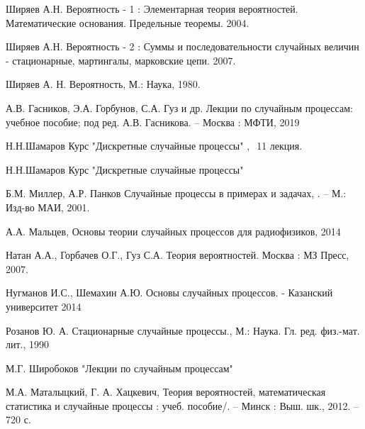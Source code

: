 \newpage


\newpage



\newpage



\newpage
\begin{thebibliography}{}
	 Ширяев А.Н. Вероятность - 1 : Элементарная теория вероятностей. Математические основания. Предельные теоремы. 2004.
	
	 Ширяев А.Н. Вероятность - 2 : Суммы и последовательности случайных величин - стационарные, мартингалы, марковские цепи. 2007.
	
	 Ширяев А. Н. Вероятность, М.: Наука, 1980.
	
	 А.В. Гасников, Э.А. Горбунов, С.А. Гуз и др. Лекции по случайным процессам: учебное пособие; под ред. А.В. Гасникова. – Москва : МФТИ, 2019 
	
	 Н.Н.Шамаров Курс "Дискретные случайные процессы" $,~$ 11 лекция.
	
	 Н.Н.Шамаров Курс "Дискретные случайные процессы"
	
	 Б.М. Миллер, А.Р. Панков Случайные процессы в примерах и задачах, . -- М.: Изд-во МАИ, 2001.
	
	 А.А. Мальцев, Основы теории случайных процессов для радиофизиков, 2014
	
	 Натан А.А., Горбачев О.Г., Гуз С.А. Теория вероятностей. Москва : МЗ Пресс, 2007.
	
	 Нугманов И.С., Шемахин А.Ю. Основы случайных процессов. - Казанский университет 2014
	
	 Розанов Ю. А. Стационарные случайные процессы., М.: Наука. Гл. ред. физ.-мат. лит., 1990
	
	 М.Г. Широбоков "Лекции по случайным процессам"
	
	 М.А. Маталыцкий,
	Г. А. Хацкевич, Теория вероятностей, математическая статистика и
	случайные процессы : учеб. пособие/. – Минск : Выш. шк., 2012. – 720 с.
	

\end{thebibliography}
